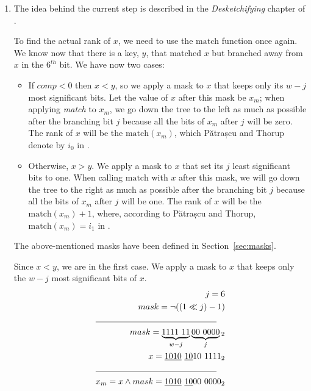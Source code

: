 \begin{enumerate}
    \item
    The idea behind the current step is described in the \textit{Desketchifying} chapter of \cite{erikdemainelec12}.
    
    To find the actual rank of $x$, we need to use the $\text{match}$ function once again. We know now that there is a key, $y$, that matched $x$ but branched away from $x$ in the $6^{th}$ bit.
    We have now two cases:
    \begin{itemize}
        \item
        If $comp < 0$ then $x < y$, so we apply a mask to $x$ that keeps only its $w-j$ most significant bits. Let the value of $x$ after this mask be $x_m$; when applying \textit{match} to $x_m$, we go down the tree to the left as much as possible after the branching bit $j$ because all the bits of $x_m$ after $j$ will be zero. The rank of $x$ will be the $\text{match}(x_m)$, which Pătrașcu and Thorup denote by $i_0$ in \cite{patrascu2014dynamic}.
        
        \item
        Otherwise, $x > y$. We apply a mask to $x$ that set its $j$ least significant bits to one. When calling $\text{match}$ with $x$ after this mask, we will go down the tree to the right as much as possible after the branching bit $j$ because all the bits of $x_m$ after $j$ will be one. The rank of $x$ will be the $\text{match}(x_m) + 1$, where, according to Pătrașcu and Thorup, $\text{match}(x_m) = i_1$ in \cite{patrascu2014dynamic}.
    \end{itemize}
    The above-mentioned masks have been defined in Section~\ref{sec:masks}.
    
    Since $x < y$, we are in the first case. We apply a mask to $x$ that keeps only the $w-j$ most significant bits of $x$. 
    \begin{align*}
        j = 6\\
        mask = \neg((1 \ll j) - 1)\\
        \cline{1-2}
        mask = \underbrace{1111\ 11}_{w-j}\underbrace{00\ 0000}_j{}_2\\
        x = \underline{1010}\ \underline{10}10\ 1111_2\\
        \cline{1-2}
        x_m = x \wedge mask = \underline{1010}\ \underline{10}00\ 0000_2
    \end{align*}


\end{enumerate}
